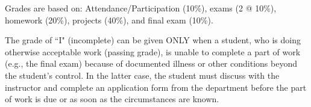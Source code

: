
Grades are based on:
    Attendance/Participation (10\%), 
    exams (2 @ 10\%), 
    homework (20\%), 
    projects (40\%), and 
    final exam (10\%).   

The grade of ``I" (incomplete) can be given ONLY when a student, who is doing otherwise acceptable work (passing grade), is unable to complete a part of work (e.g., the final exam) because of documented illness or other conditions beyond the student’s control. 
In the latter case, the student must discuss with the instructor and complete an application form from the department before the part of work is due or as soon as the circumstances are known.